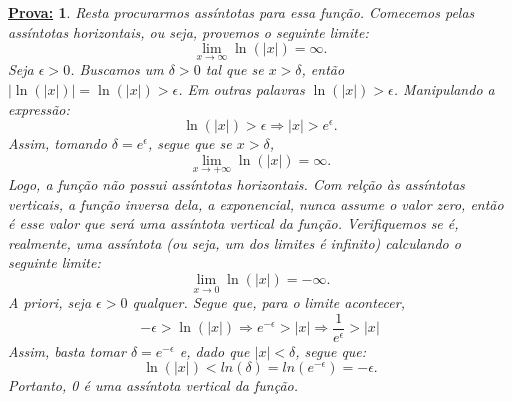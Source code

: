 \documentclass{article}
\newtheorem*{proof*}{\underline{Prova:}}
\begin{document}
\begin{proof*}
	Resta procurarmos ass\'intotas para essa fun\c c\~ao. Comecemos pelas ass\'intotas horizontais,
	ou seja, provemos o seguinte limite:
	$$
		\lim_{x\to\infty} \ln(|x|) = \infty.
	$$
	Seja $\epsilon > 0$. Buscamos um $\delta > 0$ tal que se $x > \delta$, ent\~ao $|\ln(|x|)| = \ln(|x|) > \epsilon$.
	Em outras palavras $\ln(|x|) > \epsilon$. Manipulando a express\~ao:
	$$
		\ln(|x|) > \epsilon \Rightarrow |x| >  e^{\epsilon}.
	$$
	Assim, tomando $\delta = e^{\epsilon}$, segue que se $x > \delta$,
	$$
		\lim_{x\to+\infty}\ln(|x|) = \infty.
	$$
	Logo, a fun\c c\~ao n\~ao possui ass\'intotas horizontais. Com rel\c c\~ao \`as ass\'intotas
	verticais, a fun\c c\~ao inversa dela, a exponencial, nunca assume o valor zero, ent\~ao \'e esse valor
	que ser\'a uma ass\'intota vertical da fun\c c\~ao. Verifiquemos se \'e, realmente, uma ass\'intota (ou seja, um dos
	limites \'e infinito) calculando o seguinte limite:
	$$
		\lim_{x\to0}\ln(|x|) = -\infty.
	$$
	A priori, seja $\epsilon > 0$ qualquer. Segue que, para o limite acontecer,
	$$
		-\epsilon > \ln(|x|) \Rightarrow e^{-\epsilon} > |x| \Rightarrow \frac{1}{e^{\epsilon}} > |x|
	$$
	Assim, basta tomar $\delta = e^{-\epsilon}$ e, dado que $|x| < \delta$, segue que:
	$$
		\ln(|x|) < ln(\delta) = ln(e^{-\epsilon}) = -\epsilon.
	$$
	Portanto, 0 \'e uma ass\'intota vertical da fun\c c\~ao.
\end{proof*}
\end{document}
